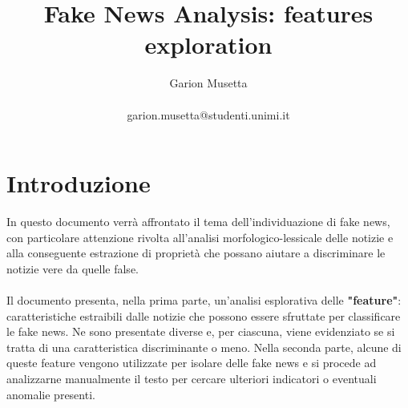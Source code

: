 \documentclass{article}
\title{\textbf{Fake News Analysis: features exploration}}
\author{Garion Musetta\\~\\garion.musetta@studenti.unimi.it}
\begin{document}
	\maketitle   
	 
   	\section{Introduzione}
    	In questo documento verrà affrontato il tema dell'individuazione di fake news, con particolare attenzione rivolta all'analisi morfologico-lessicale delle notizie e alla conseguente estrazione di proprietà che possano aiutare a discriminare le notizie vere da quelle false.
	    \\~\\
	    Il documento presenta, nella prima parte, un'analisi esplorativa delle \textbf{"feature"}: caratteristiche estraibili dalle notizie che possono essere sfruttate per classificare le fake news. Ne sono presentate diverse e, per ciascuna, viene evidenziato se si tratta di una caratteristica discriminante o meno.
	    Nella seconda parte, alcune di queste feature vengono utilizzate per isolare delle fake news e si procede ad analizzarne manualmente il testo per cercare ulteriori indicatori o eventuali anomalie presenti.
	    
	    \newpage
	    
\end{document}
